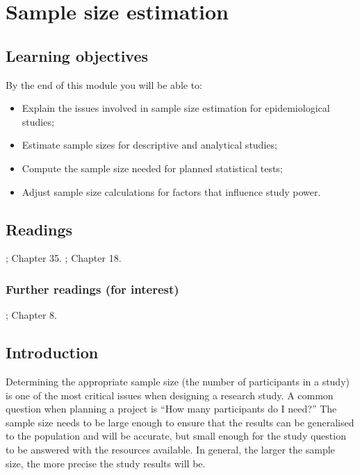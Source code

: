 \documentclass[
]{memoir}
\providecommand{\tightlist}{%
  \setlength{\itemsep}{0pt}\setlength{\parskip}{0pt}}
\begin{document}
\hypertarget{sample-size-estimation}{%
\chapter{Sample size estimation}\label{sample-size-estimation}}

\hypertarget{learning-objectives-9}{%
\section*{Learning objectives}\label{learning-objectives-9}}

By the end of this module you will be able to:

\begin{itemize}
\tightlist
\item
  Explain the issues involved in sample size estimation for epidemiological studies;
\item
  Estimate sample sizes for descriptive and analytical studies;
\item
  Compute the sample size needed for planned statistical tests;
\item
  Adjust sample size calculations for factors that influence study power.
\end{itemize}

\hypertarget{readings-9}{%
\section*{Readings}\label{readings-9}}

\citet{kirkwood_sterne01}; Chapter 35.
\citet{bland15}; Chapter 18.

\hypertarget{further-readings-for-interest}{%
\subsection*{Further readings (for interest)}\label{further-readings-for-interest}}

\citet{woodward13}; Chapter 8.

\hypertarget{introduction-9}{%
\section{Introduction}\label{introduction-9}}

Determining the appropriate sample size (the number of participants in a study) is one of the most critical issues when designing a research study. A common question when planning a project is ``How many participants do I need?'' The sample size needs to be large enough to ensure that the results can be generalised to the population and will be accurate, but small enough for the study question to be answered with the resources available. In general, the larger the sample size, the more precise the study results will be.
\end{document}
